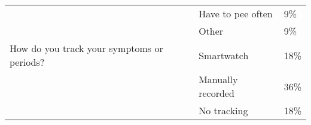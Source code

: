 \begin{table}[]
{\begin{tabular}{lll}
                                                                                        & Have to pee often      & 9\%  \\
                                                                                        & Other                  & 9\%  \\
        How do you track your symptoms or periods?                                      & Smartwatch             & 18\% \\
                                                                                        & Manually recorded      & 36\% \\
                                                                                        & No tracking            & 18\% \\ \hline
        \end{tabular}
    }
\end{table}